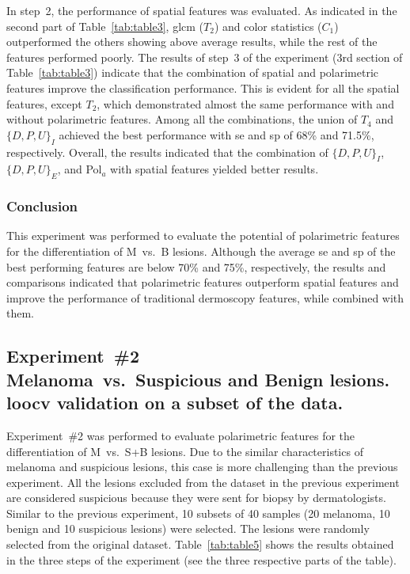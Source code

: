 In step~2, the performance of spatial features was evaluated.
As indicated in the second part of Table~\ref{tab:table3}, \ac{glcm} ($T_{2}$) and color statistics ($C_{1}$) outperformed the others showing above average results, while the rest of the features performed poorly.
The results of step~3 of the experiment (3rd section of Table~\ref{tab:table3}) indicate that the combination of spatial and polarimetric features improve the classification performance.
This is evident for all the spatial features, except $T_{2}$, which demonstrated almost the same performance with and without polarimetric features.
Among all the combinations, the union of $T_{4}$ and $\{D,P,U\}_{I}$ achieved the best performance with \ac{se} and \ac{sp} of 68\% and 71.5\%, respectively.
Overall, the results indicated that the combination of $\{D,P,U\}_{I}$, $\{D,P,U\}_{E}$, and Pol$_{a}$ with spatial features yielded better results.

\subsubsection{Conclusion}
This experiment was performed to evaluate the potential of polarimetric features for the differentiation of M~vs.~B lesions.
Although the average \ac{se} and \ac{sp} of the best performing features are below 70\% and 75\%, respectively, the results and comparisons indicated that polarimetric features outperform spatial features and improve the performance of traditional dermoscopy features, while combined with them.


\subsection{Experiment~\#2\\
\small{Melanoma~vs.~Suspicious and Benign lesions. \ac{loocv} validation on a subset of the data.}}
Experiment~\#2 was performed to evaluate polarimetric features for the differentiation of M~vs.~S+B lesions.
Due to the similar characteristics of melanoma and suspicious lesions, this case is more challenging than the previous experiment.
All the lesions excluded from the dataset in the previous experiment are considered suspicious because they were sent for biopsy by dermatologists.
Similar to the previous experiment, 10 subsets of 40 samples (20 melanoma, 10 benign and 10 suspicious lesions) were selected.
The lesions were randomly selected from the original dataset.
Table~\ref{tab:table5} shows the results obtained in the three steps of the experiment (see the three respective parts of the table). 


